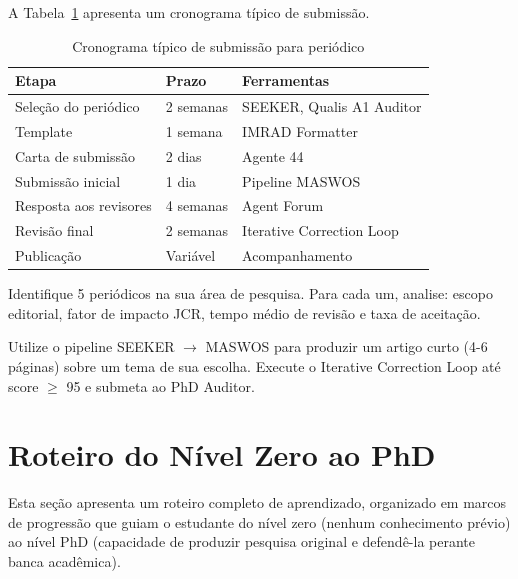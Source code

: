 A Tabela~\ref{tab:estrategia-submissao} apresenta um cronograma típico de
submissão.

\begin{table}[htb]
\centering
\caption{Cronograma típico de submissão para periódico \qualisA{}}
\label{tab:estrategia-submissao}
\begin{tabular}{lll}
\toprule
\textbf{Etapa} & \textbf{Prazo} & \textbf{Ferramentas} \\
\midrule
Seleção do periódico & 2 semanas & SEEKER, Qualis A1 Auditor \\
Template & 1 semana & IMRAD Formatter \\
Carta de submissão & 2 dias & Agente 44 \\
Submissão inicial & 1 dia & Pipeline MASWOS \\
Resposta aos revisores & 4 semanas & Agent Forum \\
Revisão final & 2 semanas & Iterative Correction Loop \\
Publicação & Variável & Acompanhamento \\
\bottomrule
\end{tabular}
\end{table}

\begin{exercicio}
    Identifique 5 periódicos \qualisA{} na sua área de pesquisa. Para cada
    um, analise: escopo editorial, fator de impacto JCR, tempo médio de
    revisão e taxa de aceitação.
\end{exercicio}

\begin{exercicio}
    Utilize o pipeline SEEKER $\rightarrow$ MASWOS para produzir um artigo
    curto (4-6 páginas) sobre um tema de sua escolha. Execute o Iterative
    Correction Loop até score $\geq$ 95 e submeta ao PhD Auditor.
\end{exercicio}

\section{Roteiro do Nível Zero ao PhD}
\label{sec:roteiro-zero-phd}
\nivelzero

Esta seção apresenta um roteiro completo de aprendizado, organizado em marcos
de progressão que guiam o estudante do nível zero (nenhum conhecimento prévio)
ao nível PhD (capacidade de produzir pesquisa original e defendê-la perante
banca acadêmica).

